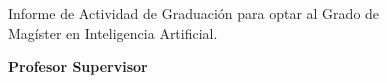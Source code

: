 \vspace{2.2cm}

\begin{center}
  {\LARGE\bfseries \tituloTesis \par}

  \vspace{1.8cm}

  {\Large \autorTesis \par}
  \vspace{4pt}
  {\large \fechaTesis \par}

  \vspace{1.8cm}

  \normalsize
  Informe de Actividad de Graduación para optar al Grado de\\
  Magíster en Inteligencia Artificial.

  \vspace{1.5cm}

  \textbf{Profesor Supervisor}\\[2pt]
  \supervisorTesis
\end{center}

\vfill
\pieMIA
\clearpage
\endgroup
